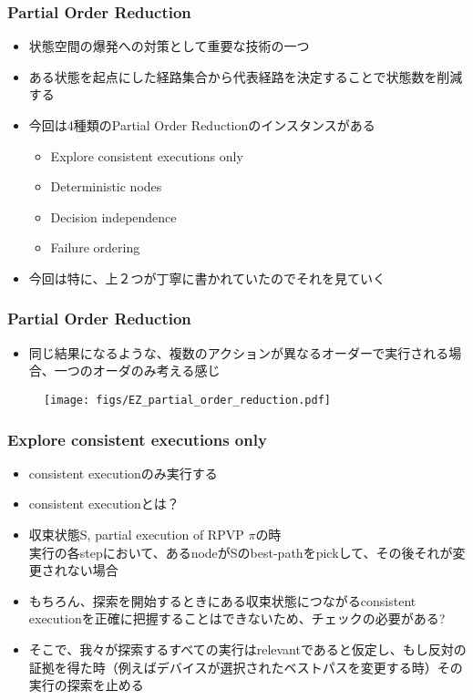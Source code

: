 \documentclass[dvipdfmx,9pt,notheorems]{beamer}
\theoremstyle{definition}
\begin{document}
\begin{frame}\frametitle{Partial Order Reduction}
\begin{itemize}
	\item 状態空間の爆発への対策として重要な技術の一つ
	\item ある状態を起点にした経路集合から代表経路を決定することで状態数を削減する
	\item 今回は4種類のPartial Order Reductionのインスタンスがある
	\begin{itemize}
		\item Explore consistent executions only
		\item Deterministic nodes
		\item Decision independence
		\item Failure ordering
	\end{itemize}
	\item 今回は特に、上２つが丁寧に書かれていたのでそれを見ていく
\end{itemize}
\pnote{
}
\end{frame}

\begin{frame}\frametitle{Partial Order Reduction}
\begin{itemize}
	\item 同じ結果になるような、複数のアクションが異なるオーダーで実行される場合、一つのオーダのみ考える感じ
\end{itemize}
\begin{figure}[htb]
  \centering
	\texttt{[image: figs/EZ\_partial\_order\_reduction.pdf]}
\end{figure}%
\pnote{
}
\end{frame}

\begin{frame}\frametitle{Explore consistent executions only}
\begin{itemize}
	\item consistent executionのみ実行する
	\item consistent executionとは？
	\item 収束状態S, partial execution of RPVP $\pi$の時\\
		実行の各stepにおいて、あるnodeがSのbest-pathをpickして、その後それが変更されない場合
	\item もちろん、探索を開始するときにある収束状態につながるconsistent executionを正確に把握することはできないため、チェックの必要がある?
	\item そこで、我々が探索するすべての実行はrelevantであると仮定し、もし反対の証拠を得た時（例えばデバイスが選択されたベストパスを変更する時）その実行の探索を止める
\end{itemize}
\end{frame}
\end{document}
